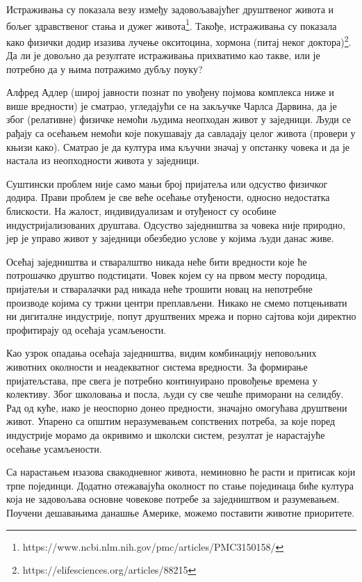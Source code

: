 \documentclass[b5paper]{article}
\begin{document}
Истраживања су показала везу између задовољавајућег друштвеног живота и бољег здравственог стања и дужег живота\footnote{https://www.ncbi.nlm.nih.gov/pmc/articles/PMC3150158/}. Такође, истраживања су показала како физички додир изазива лучење окситоцина, хормона (питај неког доктора)\footnote{https://elifesciences.org/articles/88215}. Да ли је довољно да резултате истраживања прихватимо као такве, или је потребно да у њима потражимо дубљу поуку?

Алфред Адлер (широј јавности познат по увођену појмова комплекса ниже и више вредности) је сматрао, угледајући се на закључке Чарлса Дарвина, да је због (релативне) физичке немоћи људима неопходан живот у заједници. Људи се рађају са осећањем немоћи које покушавају да савладају целог живота (провери у књизи како). Сматрао је да култура има кључни значај у опстанку човека и да је настала из неопходности живота у заједници.

Суштински проблем није само мањи број пријатеља или одсуство физичког додира. Прави проблем је све веће осећање отуђености, односно недостатка блискости. На жалост, индивидуализам и отуђеност су особине индустријализованих друштава. Одсуство заједништва за човека није природно, јер је управо живот у заједници обезбедио услове у којима људи данас живе.

Осећај заједништва и стваралштво никада неће бити вредности које ће потрошачко друштво подстицати. Човек којем су на првом месту породица, пријатељи и стваралачки рад никада неће трошити новац на непотребне производе којима су тржни  центри преплављени. Никако не смемо потцењивати ни дигиталне индустрије, попут друштвених мрежа и порно сајтова који директно профитирају од осећаја усамљености.

Као узрок опадања осећаја заједништва, видим комбинацију неповољних животних околности и неадекватног система вредности. За формирање пријатељстава, пре свега је потребно континуирано провођење времена у колективу. Због школовања и посла, људи су све чешће приморани на селидбу. Рад од куће, иако је неоспорно донео предности, значајно омогућава друштвени живот. Упарено са општим неразумевањем сопствених потреба, за које поред индустрије морамо да окривимо и школски систем, резултат је нарастајуће осећање усамљености.

Са нарастањем изазова свакодневног живота, неминовно ће расти и притисак који трпе појединци. Додатно отежавајућа околност по стање појединаца биће култура која не задовољава основне човекове потребе за заједништвом и разумевањем. Поучени дешавањима данашње Америке, можемо поставити животне приоритете.
\end{document}
